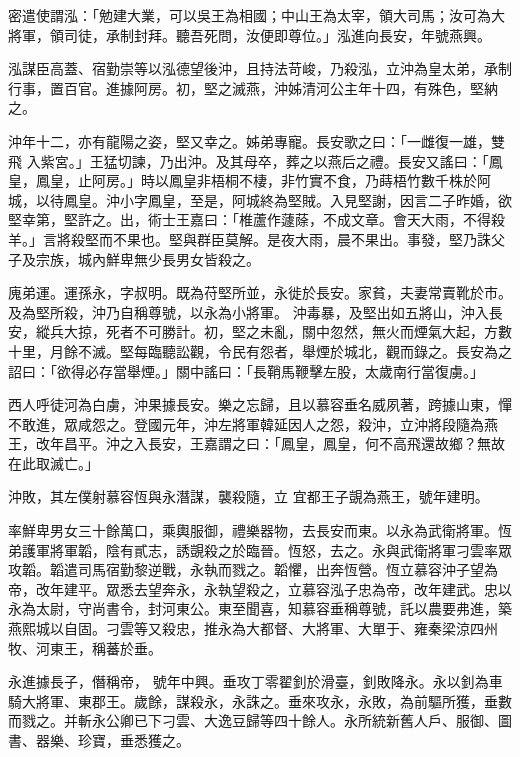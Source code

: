 \begin{pinyinscope}
 密遣使謂泓：「勉建大業，可以吳王為相國；中山王為太宰，領大司馬；汝可為大將軍，領司徒，承制封拜。聽吾死問，汝便即尊位。」泓進向長安，年號燕興。



 泓謀臣高蓋、宿勤崇等以泓德望後沖，且持法苛峻，乃殺泓，立沖為皇太弟，承制行事，置百官。進據阿房。初，堅之滅燕，沖姊清河公主年十四，有殊色，堅納之。



 沖年十二，亦有龍陽之姿，堅又幸之。姊弟專寵。長安歌之曰：「一雌復一雄，雙飛
 入紫宮。」王猛切諫，乃出沖。及其母卒，葬之以燕后之禮。長安又謠曰：「鳳皇，鳳皇，止阿房。」時以鳳皇非梧桐不棲，非竹實不食，乃蒔梧竹數千株於阿城，以待鳳皇。沖小字鳳皇，至是，阿城終為堅賊。入見堅謝，因言二子昨婚，欲堅幸第，堅許之。出，術士王嘉曰：「椎蘆作蘧蒢，不成文章。會天大雨，不得殺羊。」言將殺堅而不果也。堅與群臣莫解。是夜大雨，晨不果出。事發，堅乃誅父子及宗族，城內鮮卑無少長男女皆殺之。



 廆弟運。運孫永，字叔明。既為苻堅所並，永徙於長安。家貧，夫妻常賣靴於市。及為堅所殺，沖乃自稱尊號，以永為小將軍。
 沖毒暴，及堅出如五將山，沖入長安，縱兵大掠，死者不可勝計。初，堅之未亂，關中忽然，無火而煙氣大起，方數十里，月餘不滅。堅每臨聽訟觀，令民有怨者，舉煙於城北，觀而錄之。長安為之詔曰：「欲得必存當舉煙。」關中謠曰：「長鞘馬鞭擊左股，太歲南行當復虜。」



 西人呼徒河為白虜，沖果據長安。樂之忘歸，且以慕容垂名威夙著，跨據山東，憚不敢進，眾咸怨之。登國元年，沖左將軍韓延因人之怨，殺沖，立沖將段隨為燕王，改年昌平。沖之入長安，王嘉謂之曰：「鳳皇，鳳皇，何不高飛還故鄉？無故在此取滅亡。」



 沖敗，其左僕射慕容恆與永潛謀，襲殺隨，立
 宜都王子覬為燕王，號年建明。



 率鮮卑男女三十餘萬口，乘輿服御，禮樂器物，去長安而東。以永為武衛將軍。恆弟護軍將軍韜，陰有貳志，誘覬殺之於臨晉。恆怒，去之。永與武衛將軍刁雲率眾攻韜。韜遣司馬宿勤黎逆戰，永執而戮之。韜懼，出奔恆營。恆立慕容沖子望為帝，改年建平。眾悉去望奔永，永執望殺之，立慕容泓子忠為帝，改年建武。忠以永為太尉，守尚書令，封河東公。東至聞喜，知慕容垂稱尊號，託以農要弗進，築燕熙城以自固。刁雲等又殺忠，推永為大都督、大將軍、大單于、雍秦梁涼四州牧、河東王，稱蕃於垂。



 永進據長子，僭稱帝，
 號年中興。垂攻丁零翟釗於滑臺，釗敗降永。永以釗為車騎大將軍、東郡王。歲餘，謀殺永，永誅之。垂來攻永，永敗，為前驅所獲，垂數而戮之。并斬永公卿已下刁雲、大逸豆歸等四十餘人。永所統新舊人戶、服御、圖書、器樂、珍寶，垂悉獲之。




\end{pinyinscope}
